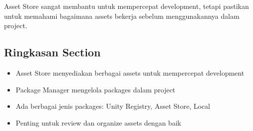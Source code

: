 \begin{catatan}
Asset Store sangat membantu untuk mempercepat development, tetapi pastikan untuk memahami bagaimana assets bekerja sebelum menggunakannya dalam project.
\end{catatan}

\subsection{Ringkasan Section}

\begin{itemize}
\item Asset Store menyediakan berbagai assets untuk mempercepat development
\item Package Manager mengelola packages dalam project
\item Ada berbagai jenis packages: Unity Registry, Asset Store, Local
\item Penting untuk review dan organize assets dengan baik
\end{itemize}
